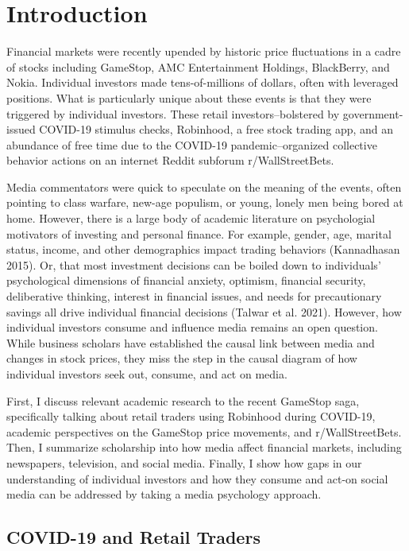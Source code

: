 \documentclass[12pt,]{article}
\begin{document}
\hypertarget{introduction}{%
\section{Introduction}\label{introduction}}

Financial markets were recently upended by historic price fluctuations
in a cadre of stocks including GameStop, AMC Entertainment Holdings,
BlackBerry, and Nokia. Individual investors made tens-of-millions of
dollars, often with leveraged positions. What is particularly unique
about these events is that they were triggered by individual investors.
These retail investors--bolstered by government-issued COVID-19 stimulus
checks, Robinhood, a free stock trading app, and an abundance of free
time due to the COVID-19 pandemic--organized collective behavior actions
on an internet Reddit subforum r/WallStreetBets.

Media commentators were quick to speculate on the meaning of the events,
often pointing to class warfare, new-age populism, or young, lonely men
being bored at home. However, there is a large body of academic
literature on psychologial motivators of investing and personal finance.
For example, gender, age, marital status, income, and other demographics
impact trading behaviors (Kannadhasan 2015). Or, that most investment
decisions can be boiled down to individuals' psychological dimensions of
financial anxiety, optimism, financial security, deliberative thinking,
interest in financial issues, and needs for precautionary savings all
drive individual financial decisions (Talwar et al. 2021). However, how
individual investors consume and influence media remains an open
question. While business scholars have established the causal link
between media and changes in stock prices, they miss the step in the
causal diagram of how individual investors seek out, consume, and act on
media.

First, I discuss relevant academic research to the recent GameStop saga,
specifically talking about retail traders using Robinhood during
COVID-19, academic perspectives on the GameStop price movements, and
r/WallStreetBets. Then, I summarize scholarship into how media affect
financial markets, including newspapers, television, and social media.
Finally, I show how gaps in our understanding of individual investors
and how they consume and act-on social media can be addressed by taking
a media psychology approach.

\hypertarget{covid-19-and-retail-traders}{%
\subsection{COVID-19 and Retail
Traders}\label{covid-19-and-retail-traders}}
\end{document}
